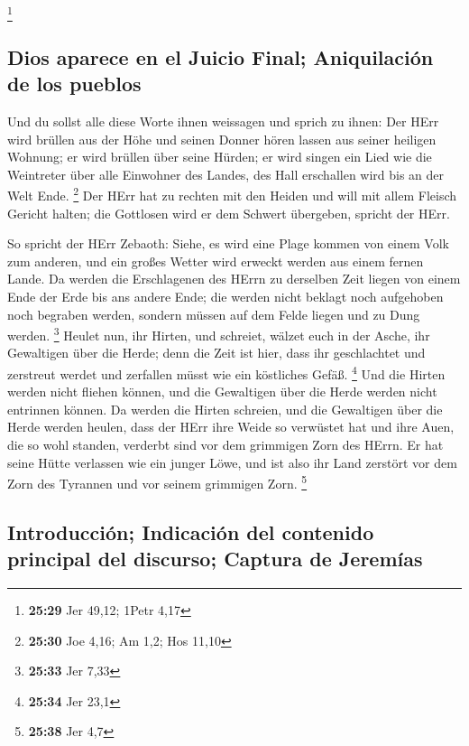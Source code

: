\footnote{\textbf{25:29} Jer 49,12; 1Petr 4,17}

\hypertarget{dios-aparece-en-el-juicio-final-aniquilaciuxf3n-de-los-pueblos}{%
\subsection{Dios aparece en el Juicio Final; Aniquilación de los
pueblos}\label{dios-aparece-en-el-juicio-final-aniquilaciuxf3n-de-los-pueblos}}

 Und du sollst alle diese Worte ihnen weissagen und
sprich zu ihnen: Der HErr wird brüllen aus der Höhe und seinen Donner
hören lassen aus seiner heiligen Wohnung; er wird brüllen über seine
Hürden; er wird singen ein Lied wie die Weintreter über alle Einwohner
des Landes, des Hall erschallen wird bis an der Welt Ende. \footnote{\textbf{25:30}
  Joe 4,16; Am 1,2; Hos 11,10}  Der HErr hat zu rechten
mit den Heiden und will mit allem Fleisch Gericht halten; die Gottlosen
wird er dem Schwert übergeben, spricht der HErr.

 So spricht der HErr Zebaoth: Siehe, es wird eine Plage
kommen von einem Volk zum anderen, und ein großes Wetter wird erweckt
werden aus einem fernen Lande.  Da werden die
Erschlagenen des HErrn zu derselben Zeit liegen von einem Ende der Erde
bis ans andere Ende; die werden nicht beklagt noch aufgehoben noch
begraben werden, sondern müssen auf dem Felde liegen und zu Dung werden.
\footnote{\textbf{25:33} Jer 7,33}  Heulet nun, ihr
Hirten, und schreiet, wälzet euch in der Asche, ihr Gewaltigen über die
Herde; denn die Zeit ist hier, dass ihr geschlachtet und zerstreut
werdet und zerfallen müsst wie ein köstliches Gefäß. \footnote{\textbf{25:34}
  Jer 23,1}  Und die Hirten werden nicht fliehen können,
und die Gewaltigen über die Herde werden nicht entrinnen können.
 Da werden die Hirten schreien, und die Gewaltigen über
die Herde werden heulen, dass der HErr ihre Weide so verwüstet hat
 und ihre Auen, die so wohl standen, verderbt sind vor
dem grimmigen Zorn des HErrn.  Er hat seine Hütte
verlassen wie ein junger Löwe, und ist also ihr Land zerstört vor dem
Zorn des Tyrannen und vor seinem grimmigen Zorn. \footnote{\textbf{25:38}
  Jer 4,7}

\hypertarget{introducciuxf3n-indicaciuxf3n-del-contenido-principal-del-discurso-captura-de-jeremuxedas}{%
\subsection{Introducción; Indicación del contenido principal del
discurso; Captura de
Jeremías}\label{introducciuxf3n-indicaciuxf3n-del-contenido-principal-del-discurso-captura-de-jeremuxedas}}

